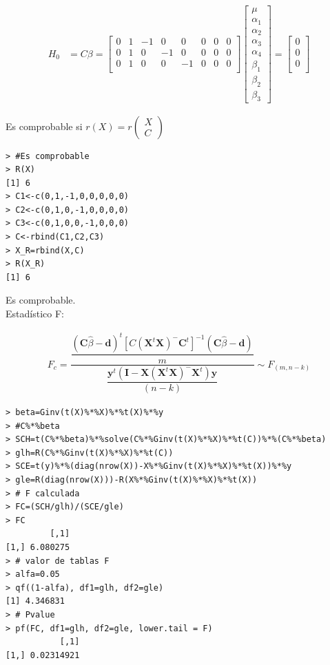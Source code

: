 \documentclass[12pt,a4paper]{report}
\begin{document}
\begin{align*}
H_0&=C\beta=
\begin{bmatrix} 0 & 1 & -1 & 0 & 0 & 0 & 0 & 0\\
               0 & 1 & 0 & -1 & 0 & 0 & 0 & 0\\
               0 & 1 & 0 & 0 & -1 & 0 & 0 & 0\\
\end{bmatrix}
\begin{bmatrix} \mu \\ \alpha_1 \\ \alpha_2 \\ \alpha_3 \\ \alpha_4 \\ \beta_1 \\ \beta_2 \\ \beta_3
\end{bmatrix}=
\begin{bmatrix} 0 \\
                0\\
                0\\
\end{bmatrix}
\end{align*}

Es comprobable si $r(X)=r\begin{pmatrix} X \\ C \end{pmatrix}$

\begin{verbatim}
> #Es comprobable
> R(X)
[1] 6
> C1<-c(0,1,-1,0,0,0,0,0)
> C2<-c(0,1,0,-1,0,0,0,0)
> C3<-c(0,1,0,0,-1,0,0,0)
> C<-rbind(C1,C2,C3)
> X_R=rbind(X,C)
> R(X_R)
[1] 6
\end{verbatim}
Es comprobable.\\

Estadístico F:


\begin{align*}
F_c=\dfrac{\dfrac{(\mathbf{C}\hat{\beta}-\mathbf{d})^t[C(\mathbf{X}^t\mathbf{X})^{-}\mathbf{C}^t]^{-1}(\mathbf{C}\hat{\beta}-\mathbf{d})}{m}}{\dfrac{\mathbf{y}^t(\mathbf{I}-\mathbf{X}(\mathbf{X}^t\mathbf{X})^{-}\mathbf{X}^t)\mathbf{y}}{(n-k)}} \sim F_{(m,n-k)}
\end{align*}


\begin{verbatim}
> beta=Ginv(t(X)%*%X)%*%t(X)%*%y
> #C%*%beta
> SCH=t(C%*%beta)%*%solve(C%*%Ginv(t(X)%*%X)%*%t(C))%*%(C%*%beta)
> glh=R(C%*%Ginv(t(X)%*%X)%*%t(C))
> SCE=t(y)%*%(diag(nrow(X))-X%*%Ginv(t(X)%*%X)%*%t(X))%*%y
> gle=R(diag(nrow(X)))-R(X%*%Ginv(t(X)%*%X)%*%t(X))
> # F calculada
> FC=(SCH/glh)/(SCE/gle)
> FC 
         [,1]
[1,] 6.080275
> # valor de tablas F
> alfa=0.05
> qf((1-alfa), df1=glh, df2=gle)
[1] 4.346831
> # Pvalue
> pf(FC, df1=glh, df2=gle, lower.tail = F)
           [,1]
[1,] 0.02314921
\end{verbatim}
\end{document}
